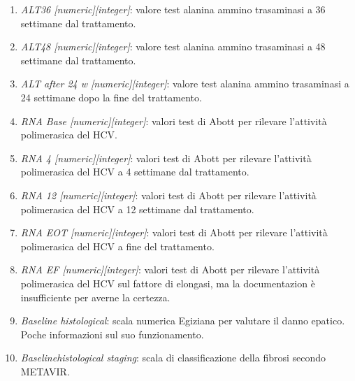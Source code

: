 \documentclass[italian,12pt,a4paper]{article}
\begin{document}
\begin{enumerate}
        \item \textit{ALT36 [numeric][integer]}: valore test alanina ammino trasaminasi a 36 settimane dal trattamento.
        \item \textit{ALT48 [numeric][integer]}: valore test alanina ammino trasaminasi a 48 settimane dal trattamento.
        \item \textit{ALT after 24 w [numeric][integer]}: valore test alanina ammino trasaminasi a 24 settimane dopo la fine del trattamento.
        \item \textit{RNA Base [numeric][integer]}: valori test di Abott per rilevare l'attività polimerasica del HCV.
        \item \textit{RNA 4 [numeric][integer]}: valori test di Abott per rilevare l'attività polimerasica del HCV a 4 settimane dal trattamento.
        \item \textit{RNA 12 [numeric][integer]}: valori test di Abott per rilevare l'attività polimerasica del HCV a 12 settimane dal trattamento.
        \item \textit{RNA EOT [numeric][integer]}: valori test di Abott per rilevare l'attività polimerasica del HCV a fine del trattamento.
        \item \textit{RNA EF [numeric][integer]}: valori test di Abott per rilevare l'attività polimerasica del HCV sul fattore di elongasi, ma la documentazion è insufficiente per averne la certezza.
        \item \textit{Baseline histological}: scala numerica Egiziana per valutare il danno epatico. Poche informazioni sul suo funzionamento.
        \item \textit{Baselinehistological staging}: scala di classificazione della fibrosi secondo METAVIR. 
    \end{enumerate}
\end{document}

